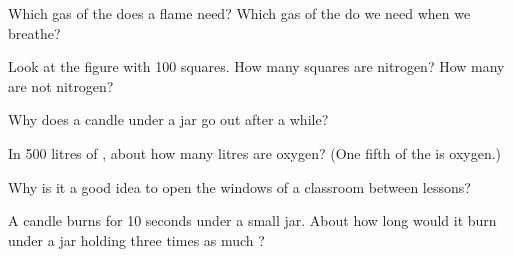 \begin{exercise}[$\star$]\label{exo:g4:air-a-mixture-of-gases:6}
Which gas of the  does a flame need? Which gas of the  do we need
when we breathe?
\end{exercise}

\begin{exercise}[$\star$]\label{exo:g4:air-a-mixture-of-gases:7}
Look at the figure with 100 squares. How many squares are nitrogen? How
many are not nitrogen?
\end{exercise}

\begin{exercise}[$\star$]\label{exo:g4:air-a-mixture-of-gases:8}
Why does a candle under a jar go out after a while?
\end{exercise}

\begin{exercise}[$\star$]\label{exo:g4:air-a-mixture-of-gases:9}
In 500 litres of , about how many litres are oxygen? (One fifth of
the  is oxygen.)
\end{exercise}

\begin{exercise}[$\star\star$]\label{exo:g4:air-a-mixture-of-gases:10}
Why is it a good idea to open the windows of a classroom between
lessons?
\end{exercise}

\begin{exercise}[$\star\star$]\label{exo:g4:air-a-mixture-of-gases:11}
A candle burns for 10 seconds under a small jar. About how long would it
burn under a jar holding three times as much ?
\end{exercise}
